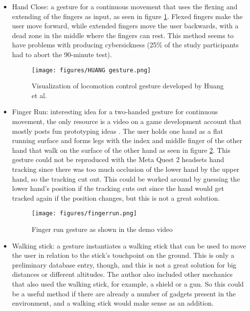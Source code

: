 \begin{itemize}
\item
  Hand Close: a gesture for a continuous movement that uses the flexing and extending of the fingers as input, as seen in figure \ref{fig:handclose}. Flexed fingers make the user move forward, while extended fingers move the user backwards, with a dead zone in the middle where the fingers can rest. This method seems to have problems
  with producing cybersickness (25\% of the study participants had to abort the 90-minute test). \cite{Huang}
  \begin{figure}[hbt!]
    \centering
    \texttt{[image: figures/HUANG gesture.png]}
    \caption{Visualization of locomotion control gesture developed by Huang et al. \cite{Huang}}
    \label{fig:handclose}
  \end{figure}

\item
  Finger Run: interesting idea for a two-handed gesture for continuous movement, the only
  resource is a video on a game development account that mostly posts fun
  prototyping ideas \cite{Beauchamp}. The user holds one hand as a flat running surface and forms legs with the index and middle finger of the other hand that walk on the surface of the other hand as seen in figure \ref{fig:fingerrun}. This gesture could not be reproduced with the Meta Quest 2 headsets hand tracking since there was too much occlusion of the lower hand by the upper hand, so the tracking cut out. This could be worked around by guessing the lower hand's position if the tracking cuts out since the hand would get tracked again if the position changes, but this is not a great solution.
  \begin{figure}[hbt!]
    \centering
    \texttt{[image: figures/fingerrun.png]}
    \caption{Finger run gesture as shown in the demo video \cite{Beauchamp}}
    \label{fig:fingerrun}
  \end{figure}

\item
  Walking stick: a gesture instantiates a walking stick that can be
  used to move the user in relation to the stick's touchpoint on the
  ground. This is only a preliminary database entry, though, and this is
  not a great solution for big distances or different altitudes. The author also included other mechanics that also used the walking stick, for example, a shield or a gun. So this could be a useful method if there are already a number of gadgets present in the environment, and a walking stick would make sense as an addition. \cite{walkingstick}
\end{itemize}

